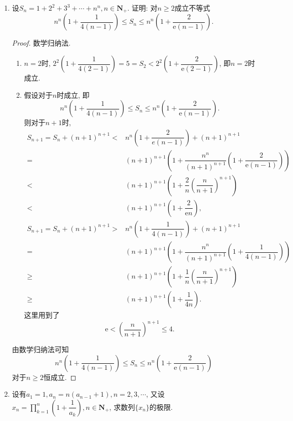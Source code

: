 \documentclass[a4paper,11pt,twoside]{ctexbook}
\newcommand{\e}{\mathrm e}
\begin{document}
\begin{enumerate}
	\item 设$S_n=1+2^2+3^3+\cdots+n^n, n\in\mathbf{N}_{+}$. 证明: 对$n\geqslant 2$成立不等式
	      \[
		      n^n\left(1+\dfrac{1}{4(n-1)}\right)\leqslant S_n\leqslant n^n\left(1+\dfrac{2}{\e(n-1)}\right).
	      \]
	      \begin{proof}
		      数学归纳法.
		      \begin{enumerate}[(1)]
			      \item $n=2$时, $2^2\left(1+\dfrac{1}{4(2-1)}\right)=5=S_2<2^2\left(1+\dfrac{2}{\e(2-1)}\right)$, 即$n=2$时成立.
			      \item 假设对于$n$时成立, 即
			            \[
				            n^n\left(1+\dfrac{1}{4(n-1)}\right)\leqslant S_n\leqslant n^n\left(1+\dfrac{2}{\e(n-1)}\right).
			            \]
			            则对于$n+1$时,
			            \[
				            \begin{split}
					            S_{n+1}=S_n+(n+1)^{n+1}<&n^n\left(1+\dfrac{2}{e(n-1)}\right)+(n+1)^{n+1}\\
					            =&(n+1)^{n+1}\left(1+\dfrac{n^n}{(n+1)^{n+1}}\left(1+\dfrac{2}{\e(n-1)}\right)\right)\\
					            <&(n+1)^{n+1}\left(1+\dfrac{2}{n}\left(\dfrac{n}{n+1}\right)^{n+1}\right)\\
					            <&(n+1)^{n+1}\left(1+\dfrac{2}{\e n}\right),\\
					            S_{n+1}=S_n+(n+1)^{n+1}>&n^n\left(1+\dfrac{1}{4(n-1)}\right)+(n+1)^{n+1}\\
					            =&(n+1)^{n+1}\left(1+\dfrac{n^n}{(n+1)^{n+1}}\left(1+\dfrac{1}{4(n-1)}\right)\right)\\
					            \geqslant&(n+1)^{n+1}\left(1+\dfrac{1}{n}\left(\dfrac{n}{n+1}\right)^{n+1}\right)\\
					            \geqslant&(n+1)^{n+1}\left(1+\dfrac{1}{4n}\right).
				            \end{split}
			            \]
			            这里用到了
			            \[
				            \e<\left(\dfrac{n}{n+1}\right)^{n+1}\leqslant 4.
			            \]
		      \end{enumerate}
		      由数学归纳法可知
		      \[
			      n^n\left(1+\dfrac{1}{4(n-1)}\right)\leqslant S_n\leqslant n^n\left(1+\dfrac{2}{\e(n-1)}\right)
		      \]
		      对于$n\geqslant 2$恒成立.\qedhere
	      \end{proof}
	\item 设有$a_1=1,a_n=n(a_{n-1}+1), n=2,3,\cdots$, 又设$x_n=\prod\limits_{k=1}^n\left(1+\dfrac{1}{a_k}\right), n\in\mathbf{N}_{+}$, 求数列$\{x_n\}$的极限.

\end{enumerate}
\end{document}
